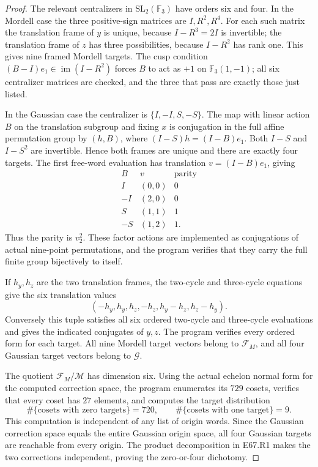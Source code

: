 \begin{proof}
The relevant centralizers in $\mathrm{SL}_2(\mathbb F_3)$ have
orders six and four. In the Mordell case the three positive-sign
matrices are $I,R^2,R^4$. For each such matrix the translation
frame of $y$ is unique, because $I-R^3=2I$ is invertible; the
translation frame of $z$ has three possibilities, because
$I-R^2$ has rank one. This gives nine framed Mordell targets.
The cusp condition $(B-I)e_1\in\operatorname{im}(I-R^2)$ forces
$B$ to act as $+1$ on $\mathbb F_3(1,-1)$; all six centralizer
matrices are checked, and the three that pass are exactly those
just listed.

In the Gaussian case the centralizer is $\{I,-I,S,-S\}$.
The map with linear action $B$ on the translation subgroup and
fixing $x$ is conjugation in the full affine permutation group by
$(h,B)$, where
$(I-S)h=(I-B)e_1$. Both $I-S$ and $I-S^2$ are invertible.
Hence both frames are unique and there are exactly four targets.
The first free-word evaluation has translation
$v=(I-B)e_1$, giving
\[
 \begin{array}{c|c|c}
 B&v&\text{parity}\\\hline
 I&(0,0)&0\\-I&(2,0)&0\\S&(1,1)&1\\-S&(1,2)&1.
 \end{array}
\]
Thus the parity is $v_2^2$. These factor actions are implemented
as conjugations of actual nine-point permutations, and the program
verifies that they carry the full finite group bijectively to itself.

If $h_y,h_z$ are the two translation frames, the two-cycle and
three-cycle equations give the six translation values
\[
 (-h_y,h_y,h_z,-h_z,h_y-h_z,h_z-h_y).                            \tag{ER3}
\]
Conversely this tuple satisfies all six ordered two-cycle and
three-cycle evaluations and gives the indicated conjugates of
$y,z$. The program verifies every ordered form for each target.
All nine Mordell target vectors belong to $\mathcal F_M$, and all
four Gaussian target vectors belong to $\mathcal G$.

The quotient $\mathcal F_M/\mathcal M$ has dimension six.
Using the actual echelon normal form for the computed correction
space, the program enumerates its $729$ cosets, verifies that every
coset has $27$ elements, and computes the target distribution
\[
       \#\{\text{cosets with zero targets}\}=720,\qquad
       \#\{\text{cosets with one target}\}=9.
\]
This computation is independent of any list of origin words.
Since the Gaussian correction space equals the entire Gaussian
origin space, all four Gaussian targets are reachable from every
origin. The product decomposition in E67.R1 makes the two
corrections independent, proving the zero-or-four dichotomy.


\end{proof}
